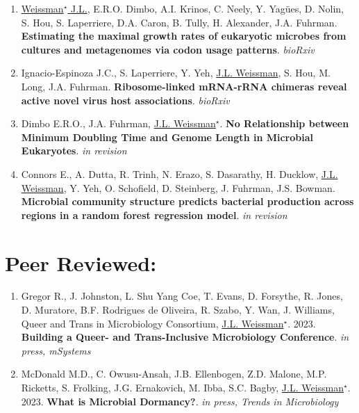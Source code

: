\documentclass[]{res}
\begin{document}
\begin{resume}
\begin{enumerate}[leftmargin=*]
\item \underline{Weissman$^\star$ J.L.}, E.R.O. Dimbo, A.I. Krinos, C. Neely, Y. Yag\"{ues}, D. Nolin, S. Hou, S. Laperriere, D.A. Caron, B. Tully, H. Alexander, J.A. Fuhrman. {\bf Estimating the maximal growth rates of eukaryotic microbes from cultures and metagenomes via codon usage patterns}. \emph{bioRxiv}

\item Ignacio-Espinoza J.C., S. Laperriere, Y. Yeh, \underline{J.L. Weissman}, S. Hou, M. Long, J.A. Fuhrman. {\bf Ribosome-linked mRNA-rRNA chimeras reveal active novel virus host associations}. \emph{bioRxiv}
 
\item Dimbo E.R.O., J.A. Fuhrman, \underline{J.L. Weissman$^\star$}. {\bf No Relationship between Minimum Doubling Time and Genome Length in Microbial Eukaryotes}. \emph{in revision}

\item Connors E., A. Dutta, R. Trinh, N. Erazo, S. Dasarathy, H. Ducklow, \underline{J.L. Weissman}, Y. Yeh, O. Schofield, D. Steinberg, J. Fuhrman, J.S. Bowman. {\bf Microbial community structure predicts bacterial production across regions in a random forest regression model}. \emph{in revision}

  \end{enumerate} 

  
 \section{Peer Reviewed:} \vspace{0mm}
 
\begin{enumerate}[leftmargin=*]
 \setlength\itemsep{0.25em}

 \item Gregor R., J. Johnston, L. Shu Yang Coe, T. Evans, D. Forsythe, R. Jones, D. Muratore, B.F. Rodrigues de Oliveira, R. Szabo, Y. Wan, J. Williams, Queer and Trans in Microbiology Consortium, \underline{J.L. Weissman$^\star$}. 2023. {\bf Building a Queer- and Trans-Inclusive Microbiology Conference}. \emph{in press, mSystems} 
 
 \item McDonald M.D., C. Owusu-Ansah, J.B. Ellenbogen, Z.D. Malone, M.P. Ricketts, S. Frolking, J.G. Ernakovich, M. Ibba, S.C. Bagby, \underline{J.L. Weissman$^\star$}. 2023. {\bf What is Microbial Dormancy?}. \emph{in press, Trends in Microbiology}
 

\end{enumerate}
\end{resume}
\end{document}
